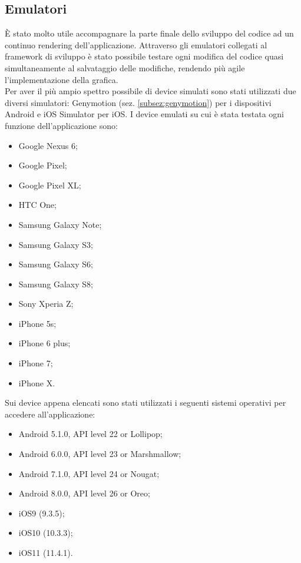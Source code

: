\subsection{Emulatori}
È stato molto utile accompagnare la parte finale dello sviluppo del codice ad un continuo rendering dell'applicazione. Attraverso gli emulatori collegati al framework di sviluppo è stato possibile testare ogni modifica del codice quasi simultaneamente al salvataggio delle modifiche, rendendo più agile l'implementazione della grafica. \\
Per aver il più ampio spettro possibile di device simulati sono stati utilizzati due diversi simulatori: Genymotion (sez. \ref{subsez:genymotion}) per i dispositivi Android e iOS Simulator per iOS.
I device emulati su cui è stata testata ogni funzione dell'applicazione sono:
\begin{itemize}
	\item Google Nexus 6;
	\item Google Pixel;
	\item Google Pixel XL;
	\item HTC One;
	\item Samsung Galaxy Note;
	\item Samsung Galaxy S3;
	\item Samsung Galaxy S6;
	\item Samsung Galaxy S8;
	\item Sony Xperia Z;
	\item iPhone 5s;
	\item iPhone 6 plus;
	\item iPhone 7;
	\item iPhone X.
\end{itemize}
Sui device appena elencati sono stati utilizzati i seguenti sistemi operativi per accedere all'applicazione:
\begin{itemize}
	\item Android 5.1.0, API level 22 or Lollipop;
	\item Android 6.0.0, API level 23 or Marshmallow;
	\item Android 7.1.0,  API level 24 or Nougat;
	\item Android 8.0.0,  API level 26 or Oreo;
	\item iOS9 (9.3.5);
	\item iOS10 (10.3.3);
	\item iOS11 (11.4.1).
\end{itemize}
